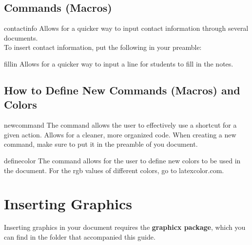 \documentclass[12pt,hidelinks]{article}
\begin{document}
	\subsection{Commands (Macros)}
		\begin{docCommand}{contactinfo}{}
				Allows for a quicker way to input contact information through several documents.\\ 
				To insert contact information, put the following in your preamble:\\ 
		\end{docCommand}
		\begin{docCommand}{fillin}{}
			Allows for a quicker way to input a line for students to fill in the notes.
		\end{docCommand}
	\subsection{How to Define New Commands (Macros) and Colors}
		\begin{docCommand}{newcommand}{}
			The command  allows the user to effectively use a shortcut for a given action. Allows for a cleaner, more organized code. When creating a new command, make sure to put it in the preamble of you document.  
		\end{docCommand}
		\begin{docCommand}{definecolor}{}
			The  command allows for the user to define new colors to be used in the document. For the rgb values of different colors, go to latexcolor.com.
		\end{docCommand}
\newpage
\section{Inserting Graphics}
\vspace{10.5cm}
	Inserting graphics in your document requires the  \textbf{graphicx package}, which you can find in the folder that accompanied this guide.
\end{document}
